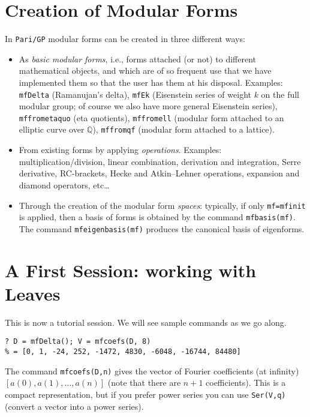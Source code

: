 \documentclass[11pt]{article}
\newcommand{\Q}{{\mathbb Q}}
\def\kbd#1{{\tt #1}}
\begin{document}
\section{Creation of Modular Forms}

In \kbd{Pari/GP} modular forms can be created in three different ways:

\begin{itemize}\item As \emph{basic modular forms}, i.e., forms attached (or
  not) to different mathematical objects, and which are of so frequent use
  that we have implemented them so that the user has them at his disposal.
  Examples: \kbd{mfDelta} (Ramanujan's delta), \kbd{mfEk}
  (Eisenstein series of weight $k$ on the full modular group; of course
  we also have more general Eisenstein series), \kbd{mffrometaquo}
  (eta quotients), \kbd{mffromell} (modular form attached to an elliptic
  curve over $\Q$), \kbd{mffromqf} (modular form attached
  to a lattice).
\item From existing forms by applying \emph{operations}.
  Examples: multiplication/division, linear combination,
  derivation and integration, Serre derivative, RC-brackets, Hecke and
  Atkin--Lehner operations, expansion and diamond operators, etc\dots
\item Through the creation of the modular form \emph{spaces}:
  typically, if only \kbd{mf=mfinit} is applied, then a
  basis of forms is obtained by the command \kbd{mfbasis(mf)}.
  The command \kbd{mfeigenbasis(mf)} produces the canonical basis of
  eigenforms.\end{itemize}

\section{A First Session: working with Leaves}

This is now a tutorial session. We will see sample commands as we go along.

\begin{verbatim}
? D = mfDelta(); V = mfcoefs(D, 8)
% = [0, 1, -24, 252, -1472, 4830, -6048, -16744, 84480]
\end{verbatim}

The command \kbd{mfcoefs(D,n)} gives the vector of Fourier coefficients (at
infinity) $[a(0),a(1),\dots,a(n)]$ (note that there are $n+1$ coefficients).
This is a compact representation, but if you prefer power series you
can use \kbd{Ser(V,q)} (convert a vector into a power series).
\end{document}
